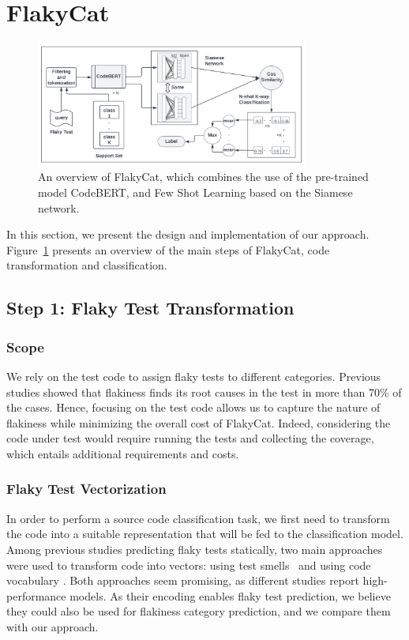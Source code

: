 \section{FlakyCat}
\label{sec:flakycat-flakycat}

\begin{figure}[htbp]
\centering
\includegraphics[width=0.8\textwidth,scale=1]{figures/flakycat/architecture.png}
\caption{An overview of FlakyCat, which combines the use of the pre-trained model CodeBERT, and Few Shot Learning based on the Siamese network.}
\label{fig:general_arch}
\end{figure}

In this section, we present the design and implementation of our approach.
Figure~\ref{fig:general_arch} presents an overview of the main steps of FlakyCat, code transformation and classification. 

\subsection{Step 1: Flaky Test Transformation}

\subsubsection{Scope} We rely on the test code to assign flaky tests to different categories.
Previous studies showed that flakiness finds its root causes in the test in more than 70\% of the cases\cite{Luo2014,Lam2020a}. 
Hence, focusing on the test code allows us to capture the nature of flakiness while minimizing the overall cost of FlakyCat. 
Indeed, considering the code under test would require running the tests and collecting the coverage, which entails additional requirements and costs.

\subsubsection{Flaky Test Vectorization}
In order to perform a source code classification task, we first need to transform the code into a suitable representation that will be fed to the classification model. Among previous studies predicting flaky tests statically, two main approaches were used to transform code into vectors: using test smells~\cite{camara2021use,FlakeFlagger} and using code vocabulary \cite{Pinto2020,Haben2021,Camara2021VocabExtendedReplication}.
Both approaches seem promising, as different studies report high-performance models. As their encoding enables flaky test prediction, we believe they could also be used for flakiness category prediction, and we compare them with our approach. 

